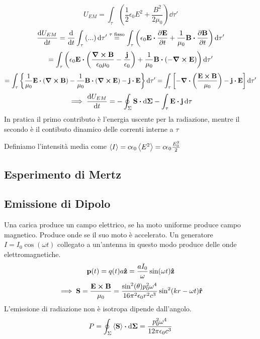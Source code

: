 \documentclass[12pt,a4paper]{article}
\begin{document}
\begin{equation*}
    U_{EM}= \int_\tau\left( \frac{1}{2}\epsilon_0E^2 + \frac{B^2}{2\mu_0} \right)\dd{\tau'}
\end{equation*}
\begin{equation*}
    \dv{U_{EM}}{t}= \dv{}{t}\int_\tau\left( ... \right)\dd{\tau'}\overset{\tau \text{ fisso}}{=}
    \int_\tau\left( \epsilon_0 \vb{E}\vdot\pdv{\vb{E}}{t}+ \frac{1}{\mu_0}\vb{B}\vdot\pdv{\vb{B}}{t}\right)\dd{\tau'}
\end{equation*}
\begin{equation*}
    =\int_\tau\left( \epsilon_0\vb{E}\vdot\left( \frac{\curl{\vb{B}}}{\epsilon_0\mu_0} -\frac{\vb{j}}{\epsilon_0} \right) + 
    \frac{1}{\mu_0}\vb{B}\vdot\left( - \curl{\vb{E}} \right) \right)\dd{\tau'}
\end{equation*}
\begin{equation*}
    = \int_\tau\left\{ \frac{1}{\mu_0}\vb{E}\vdot\left( \curl{\vb{B}} \right)-\frac{1}{\mu_0}\vb{B}\vdot\left( \curl{\vb{E}} \right)- \vb{j}\vdot\vb{E} \right\}\dd{\tau'}
    = \int_\tau \left[ - \div(\frac{\vb{E}\cp\vb{B}}{\mu_0})-\vb{j}\vdot\vb{E} \right]\dd{\tau'}
\end{equation*}
\begin{equation*}
    \implies\dv{U_{EM}}{t}= -\oint_\Sigma \vb{S}\vdot\dd{\vb{\Sigma}}-\int_\tau\vb{E}\vdot\vb{j}\dd{\tau}
\end{equation*}
In pratica il primo contributo è l'energia uscente per la radiazione, mentre il secondo è il contibuto dinamico delle correnti interne a $\tau$

Definiamo l'intensità media come $\expval{I}= c\epsilon_0\expval{E^2}= c \epsilon_0\frac{E_0^2}{2}$



\subsection{Esperimento di Mertz}
\subsection{Emissione di Dipolo}
Una carica produce un campo elettrico, se ha moto uniforme produce campo magnetico. Produce onde se il suo moto è accelerato.
Un generatore $I = I_0 \cos(\omega t)$ collegato a un'antenna in questo modo produce delle onde elettromagnetiche.
\begin{equation*}
    \vb{p}(t)=q(t)a\vu{z} = \frac{aI_0}{\omega}\sin(\omega t)\vu{z}  
\end{equation*}
\begin{equation*}
    \implies \vb{S}= \frac{\vb{E}\cp\vb{B}}{\mu_0} = \frac{\sin[2](\theta)p_0^2\omega^4}{16\pi^2\epsilon_0r^2c^3}\sin[2](kr-\omega t)\vu{r}
\end{equation*}
L'emissione di radiazione non è isotropa dipende dall'angolo.
\begin{equation*}
    P= \oint_\Sigma \expval{\vb{S}}\vdot\dd{\vb{\Sigma}}= \frac{p_0^2\omega^4}{12\pi\epsilon_0c^3}
\end{equation*}
\end{document}
